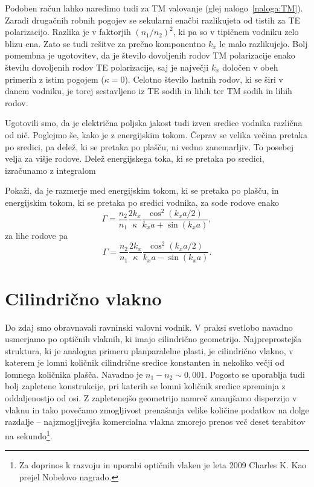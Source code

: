 Podoben račun lahko naredimo tudi za TM valovanje (glej nalogo~\ref{naloga:TM}). Zaradi drugačnih
robnih pogojev se sekularni enačbi razlikujeta od tistih za TE polarizacijo. Razlika je v
faktorjih $(n_1/n_2)^2$, ki pa so v tipičnem vodniku zelo blizu ena. Zato se tudi rešitve 
za prečno komponentno $k_x$ le malo razlikujejo. Bolj pomembna je ugotovitev, da je število
dovoljenih rodov TM polarizacije enako številu dovoljenih rodov TE polarizacije, 
saj je največji $k_x$ določen v obeh primerih z istim pogojem 
($\kappa = 0$). Celotno število lastnih rodov, ki se širi v danem vodniku, je torej sestavljeno 
iz TE sodih in lihih ter TM sodih in lihih rodov.

Ugotovili smo, da je električna poljska jakost tudi izven sredice vodnika različna od nič. 
Poglejmo še, kako je z energijskim tokom. Čeprav se velika večina pretaka po sredici, 
pa delež, ki se pretaka po plašču, ni vedno zanemarljiv. To posebej velja za višje rodove. 
Delež energijskega toka, ki se pretaka po sredici, izračunamo
z integralom
\begin{definition}
Pokaži, da je razmerje med energijskim tokom, ki se pretaka po plašču, in energijskim tokom, 
ki se pretaka po sredici vodnika, za sode rodove enako
\begin{equation}
\Gamma = \frac{n_2}{n_1}\frac{2 k_x}{\kappa} \frac{\cos^2(k_x a/2)}{k_xa + \sin(k_xa)},
\end{equation}
za lihe rodove pa 
\begin{equation}
\Gamma = \frac{n_2}{n_1}\frac{2 k_x}{\kappa} \frac{\cos^2(k_x a/2)}{k_xa - \sin(k_xa)}.
\end{equation}
\end{definition}


\section{Cilindrično vlakno}
\label{chap:Cilinder}
Do zdaj smo obravnavali ravninski valovni vodnik. V praksi svetlobo
navadno usmerjamo po optičnih vlaknih, ki imajo cilindrično geometrijo.
Najpreprostejša struktura, ki je analogna primeru planparalelne
plasti, je cilindrično vlakno, v katerem je lomni količnik cilindrične
sredice konstanten in nekoliko večji od lomnega količnika plašča. Navadno je 
$n_1 - n_2 \sim 0,001$. Pogosto se uporablja
tudi bolj zapletene konstrukcije, pri katerih se lomni količnik sredice spreminja z
oddaljenostjo od osi. Z zapletenejšo geometrijo namreč zmanjšamo disperzijo v vlaknu in tako
povečamo zmogljivost prenašanja velike količine podatkov na dolge razdalje -- 
najzmogljivejša komercialna vlakna zmorejo prenos več deset terabitov na 
sekundo\footnote{Za doprinos k razvoju in uporabi optičnih vlaken je leta 2009 Charles
K. Kao prejel Nobelovo nagrado.}.


